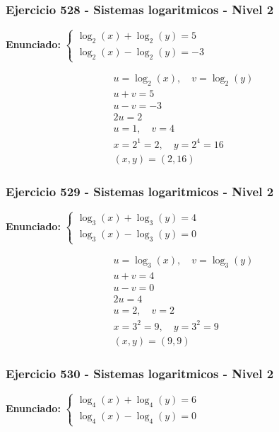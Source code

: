 \documentclass[12pt,a4paper]{article}
\begin{document}
\subsubsection*{Ejercicio 528 - Sistemas logaritmicos - Nivel 2}
\textbf{Enunciado:} \(\begin{cases} \log_{2}\left(x\right)+\log_{2}\left(y\right)=5\\ \log_{2}\left(x\right)-\log_{2}\left(y\right)=-3\end{cases}\)

\[
\begin{aligned}
u=\log_{2}\left(x\right),\quad v=\log_{2}\left(y\right)\\
u+v=5\\
u-v=-3\\
2u=2\\
u=1,\quad v=4\\
x=2^{1}=2,\quad y=2^{4}=16\\
\boxed{(x,y)=(2,16)}
\end{aligned}
\]


\subsubsection*{Ejercicio 529 - Sistemas logaritmicos - Nivel 2}
\textbf{Enunciado:} \(\begin{cases} \log_{3}\left(x\right)+\log_{3}\left(y\right)=4\\ \log_{3}\left(x\right)-\log_{3}\left(y\right)=0\end{cases}\)

\[
\begin{aligned}
u=\log_{3}\left(x\right),\quad v=\log_{3}\left(y\right)\\
u+v=4\\
u-v=0\\
2u=4\\
u=2,\quad v=2\\
x=3^{2}=9,\quad y=3^{2}=9\\
\boxed{(x,y)=(9,9)}
\end{aligned}
\]


\subsubsection*{Ejercicio 530 - Sistemas logaritmicos - Nivel 2}
\textbf{Enunciado:} \(\begin{cases} \log_{4}\left(x\right)+\log_{4}\left(y\right)=6\\ \log_{4}\left(x\right)-\log_{4}\left(y\right)=0\end{cases}\)
\end{document}
